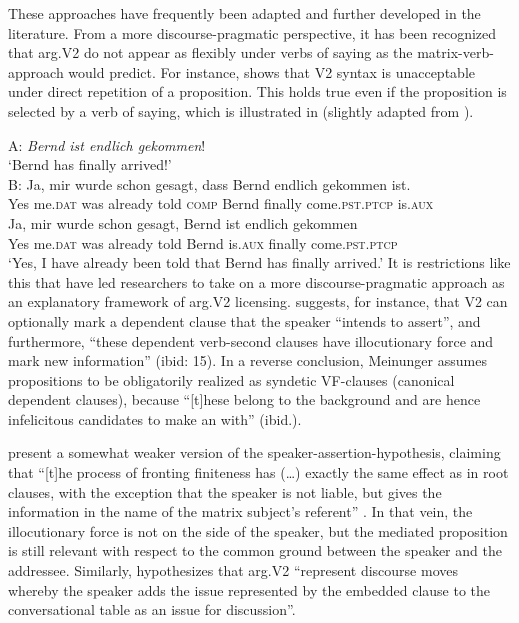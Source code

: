 \documentclass[output=paper,colorlinks,citecolor=brown]{langscibook}
\begin{document}
These approaches have frequently been adapted and further developed in the literature. From a more discourse-pragmatic perspective, it has been recognized that arg.V2 do not appear as flexibly under verbs of saying as the matrix-verb-approach would predict. For instance, \citet{Meinunger2006} shows that V2 syntax is unacceptable under direct repetition of a proposition. This holds true even if the proposition is selected by a verb of saying, which is illustrated in  (slightly adapted from \citealt[7]{Meinunger2006}).

\ea \label{ex:reetz:6}
\glt A: {\itshape Bernd ist endlich gekommen}! \\
    `Bernd has finally arrived!'\\
    B:
\ea \label{ex:reetz:7}
\gll Ja, mir wurde schon gesagt, dass Bernd endlich gekommen ist.  \\
     Yes me.\textsc{dat} was already told \textsc{comp} Bernd finally come.\textsc{pst}.\textsc{ptcp} is.\textsc{aux}\\
\ex \label{ex:reetz:8}
\gll *Ja, mir wurde schon gesagt, Bernd ist endlich gekommen\\
     Yes me.\textsc{dat} was already told Bernd is.\textsc{aux} finally come.\textsc{pst}.\textsc{ptcp}\\
\glt `Yes, I have already been told that Bernd has finally arrived.'
\z
\z
It is restrictions like this that have led researchers to take on a more discourse-pragmatic approach as an explanatory framework of arg.V2 licensing. \citet[2]{Meinunger2006} suggests, for instance, that V2 can optionally mark a dependent clause that the speaker “intends to assert”, and furthermore, “these dependent verb-second clauses have illocutionary force and mark new information” (ibid: 15). In a reverse conclusion, Meinunger assumes  propositions to be obligatorily realized as syndetic VF-clauses (canonical dependent clauses), because “[t]hese belong to the background and are hence infelicitous candidates to make an  with” (ibid.).

\citet{LohnsteinStaratschek2020} present a somewhat weaker version of the speaker-assertion-hypothesis, claiming that “[t]he process of fronting finiteness has (…) exactly the same effect as in root clauses, with the exception that the speaker is not liable, but gives the information in the name of the matrix subject's referent” \citep[138]{LohnsteinStaratschek2020}. In that vein, the illocutionary force is not on the side of the speaker, but the mediated proposition is still relevant with respect to the common ground between the speaker and the addressee. Similarly, \citet{Djärv2022} hypothesizes that arg.V2 “represent discourse moves whereby the speaker adds the issue represented by the embedded clause to the conversational table as an issue for discussion”.
\end{document}
